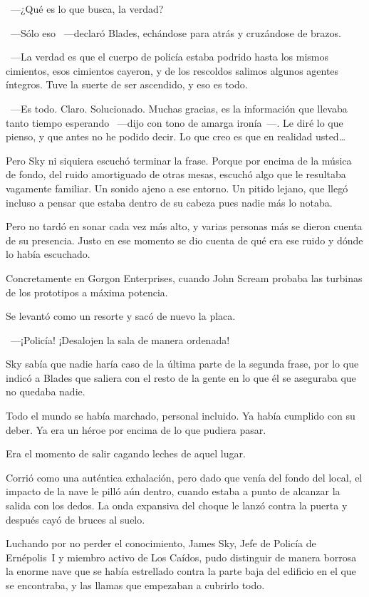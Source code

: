 ~---¿Qué es lo que busca, la verdad?

~---Sólo eso ~---declaró Blades, echándose para atrás y cruzándose de brazos.

~---La verdad es que el cuerpo de policía estaba podrido hasta los mismos cimientos, esos cimientos cayeron, y de los rescoldos salimos algunos agentes íntegros. Tuve la suerte de ser ascendido, y eso es todo.

~---Es todo. Claro. Solucionado. Muchas gracias, es la información que llevaba tanto tiempo esperando ~---dijo con tono de amarga ironía~---. Le diré lo que pienso, y que antes no he podido decir. Lo que creo es que en realidad usted\dots

Pero Sky ni siquiera escuchó terminar la frase. Porque por encima de la música de fondo, del ruido amortiguado de otras mesas, escuchó algo que le resultaba vagamente familiar. Un sonido ajeno a ese entorno. Un pitido lejano, que llegó incluso a pensar que estaba dentro de su cabeza pues nadie más lo notaba.

Pero no tardó en sonar cada vez más alto, y varias personas más se dieron cuenta de su presencia. Justo en ese momento se dio cuenta de qué era ese ruido y dónde lo había escuchado.

Concretamente en Gorgon Enterprises, cuando John Scream probaba las turbinas de los prototipos a máxima potencia.

Se levantó como un resorte y sacó de nuevo la placa.

~---¡Policía! ¡Desalojen la sala de manera ordenada!

Sky sabía que nadie haría caso de la última parte de la segunda frase, por lo que indicó a Blades que saliera con el resto de la gente en lo que él se aseguraba que no quedaba nadie.

Todo el mundo se había marchado, personal incluido. Ya había cumplido con su deber. Ya era un héroe por encima de lo que pudiera pasar.

Era el momento de salir cagando leches de aquel lugar.

Corrió como una auténtica exhalación, pero dado que venía del fondo del local, el impacto de la nave le pilló aún dentro, cuando estaba a punto de alcanzar la salida con los dedos. La onda expansiva del choque le lanzó contra la puerta y después cayó de bruces al suelo.

Luchando por no perder el conocimiento, James Sky, Jefe de Policía de Ernépolis~I y miembro activo de Los Caídos, pudo distinguir de manera borrosa la enorme nave que se había estrellado contra la parte baja del edificio en el que se encontraba, y las llamas que empezaban a cubrirlo todo.

